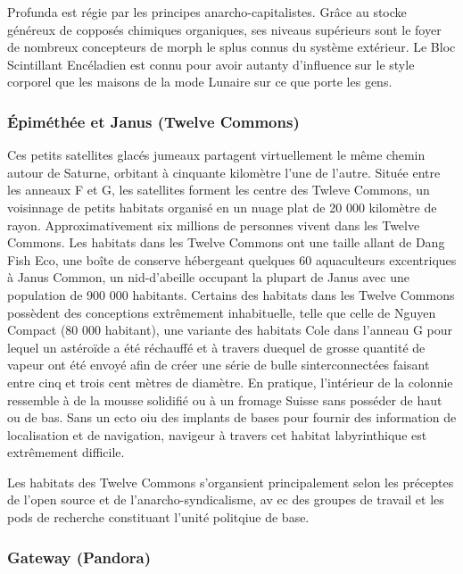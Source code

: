 Profunda est régie par les principes anarcho-capitalistes. Grâce au stocke généreux de copposés chimiques organiques, ses niveaus supérieurs sont le foyer de nombreux concepteurs de morph le splus connus du système extérieur. Le Bloc Scintillant Encéladien est connu pour avoir autanty d'influence sur le style corporel que les maisons de la mode Lunaire sur ce que porte les gens. 

\subsubsection{Épiméthée et Janus (Twelve Commons)} \label{sec:epim-janus-twelve} 

Ces petits satellites glacés jumeaux partagent virtuellement le même chemin autour de Saturne, orbitant à cinquante kilomètre l'une de l'autre. Située entre les anneaux F et G, les satellites forment les centre des Twleve Commons, un voisinnage de petits habitats organisé en un nuage plat de 20 000 kilomètre de rayon. Approximativement six millions de personnes vivent dans les Twelve Commons. Les habitats dans les Twelve Commons ont une taille allant de Dang Fish Eco, une boîte de conserve hébergeant quelques 60 aquaculteurs excentriques à Janus Common, un nid-d'abeille occupant la plupart de Janus avec une population de 900 000 habitants. Certains des habitats dans les Twelve Commons possèdent des conceptions extrêmement inhabituelle, telle que celle de Nguyen Compact (80 000 habitant), une variante des habitats Cole dans l'anneau G pour lequel un astéroïde a été réchauffé et à travers duequel de grosse quantité de vapeur ont été envoyé afin de créer une série de bulle sinterconnectées faisant entre cinq et trois cent mètres de diamètre. En pratique, l'intérieur de la colonnie ressemble à de la mousse solidifié ou à un fromage Suisse sans posséder de haut ou de bas. Sans un ecto oiu des implants de bases pour fournir des information de localisation et de navigation, navigeur à travers cet habitat labyrinthique est extrêmement difficile. 

Les habitats des Twelve Commons s'organsient principalement selon les préceptes de l'open source et de l'anarcho-syndicalisme, av ec des groupes de travail et les pods de recherche constituant l'unité politqiue de base. 

\subsubsection{Gateway (Pandora)} \label{sec:gateway-pandora} 

